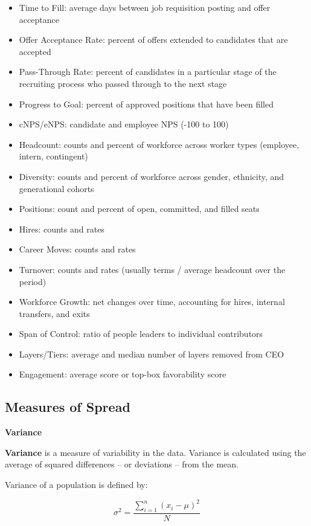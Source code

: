 \documentclass[]{book}
\providecommand{\tightlist}{%
  \setlength{\itemsep}{0pt}\setlength{\parskip}{0pt}}
\begin{document}
\begin{itemize}
\tightlist
\item
  Time to Fill: average days between job requisition posting and offer acceptance
\item
  Offer Acceptance Rate: percent of offers extended to candidates that are accepted
\item
  Pass-Through Rate: percent of candidates in a particular stage of the recruiting process who passed through to the next stage
\item
  Progress to Goal: percent of approved positions that have been filled
\item
  cNPS/eNPS: candidate and employee NPS (-100 to 100)
\item
  Headcount: counts and percent of workforce across worker types (employee, intern, contingent)
\item
  Diversity: counts and percent of workforce across gender, ethnicity, and generational cohorts
\item
  Positions: count and percent of open, committed, and filled seats
\item
  Hires: counts and rates
\item
  Career Moves: counts and rates
\item
  Turnover: counts and rates (usually terms / average headcount over the period)
\item
  Workforce Growth: net changes over time, accounting for hires, internal transfers, and exits
\item
  Span of Control: ratio of people leaders to individual contributors
\item
  Layers/Tiers: average and median number of layers removed from CEO
\item
  Engagement: average score or top-box favorability score
\end{itemize}

\hypertarget{measures-of-spread}{%
\subsection{Measures of Spread}\label{measures-of-spread}}

\textbf{Variance}

\textbf{Variance} is a measure of variability in the data. Variance is calculated using the average of squared differences -- or deviations -- from the mean.

Variance of a population is defined by:

\[ \sigma^{2} = \frac{\displaystyle\sum_{i=1}^{n} (x_{i}-\mu)^{2}}{N} \]
\end{document}
